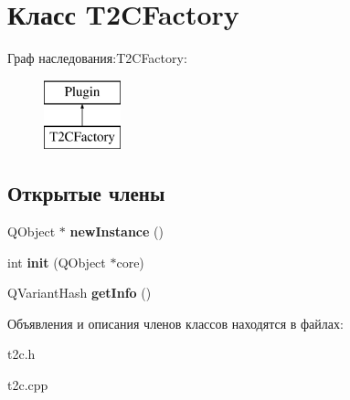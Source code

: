 \hypertarget{class_t2_c_factory}{\section{Класс T2\-C\-Factory}
\label{class_t2_c_factory}
}
Граф наследования\-:T2\-C\-Factory\-:\begin{figure}[H]
\begin{center}
\leavevmode
\includegraphics[height=2.000000cm]{class_t2_c_factory}
\end{center}
\end{figure}
\subsection*{Открытые члены}
\begin{DoxyCompactItemize}
\item 
\hypertarget{class_t2_c_factory_ab411a46a7147ee8d1130697aeca2eb29}{Q\-Object $\ast$ {\bfseries new\-Instance} ()}\label{class_t2_c_factory_ab411a46a7147ee8d1130697aeca2eb29}

\item 
\hypertarget{class_t2_c_factory_a51a7dac626d2972dd5729f9a0d49f756}{int {\bfseries init} (Q\-Object $\ast$core)}\label{class_t2_c_factory_a51a7dac626d2972dd5729f9a0d49f756}

\item 
\hypertarget{class_t2_c_factory_aabbd4502d962a7c888c0531eac257790}{Q\-Variant\-Hash {\bfseries get\-Info} ()}\label{class_t2_c_factory_aabbd4502d962a7c888c0531eac257790}

\end{DoxyCompactItemize}


Объявления и описания членов классов находятся в файлах\-:\begin{DoxyCompactItemize}
\item 
t2c.\-h\item 
t2c.\-cpp\end{DoxyCompactItemize}
